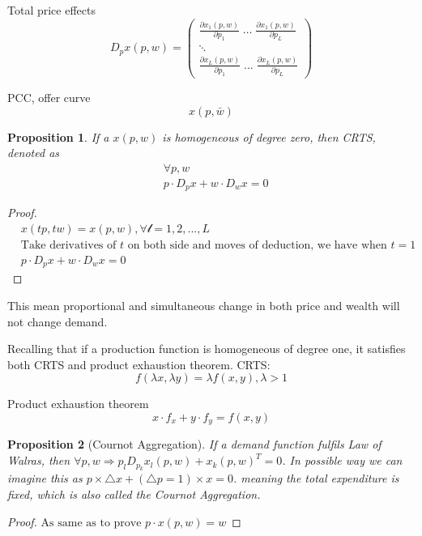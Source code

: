 \documentclass{article}
\newtheorem{proposition}{Proposition}
\begin{document}
Total price effects
$$D_{p}x(p,w)=\begin{pmatrix}\frac{\partial x_{1}(p,w)}{\partial p_{1}}\; \dots\;\frac{\partial x_{1}(p,w)}{\partial p_{L}} \\  \ddots \\ \frac{\partial x_{L}(p,w)}{\partial p_{1}}\;\dots\;\frac{\partial x_{L}(p,w)}{\partial p_{L}}\end{pmatrix}$$

PCC, offer curve
$$x(p,\bar{w})$$


\begin{proposition}
If a $x(p,w)$ is homogeneous of degree zero, then CRTS, denoted as
\begin{align}
&\forall p,w
\\&p\cdot D_{p}x+w\cdot D_{w}x=0
\end{align}
\end{proposition}

\begin{proof}
\begin{align}
& x(tp,tw)=x(p,w),\forall \mathscr{l}=1,2,...,L
\\&\text{Take derivatives of }t \text{ on both side and moves of deduction, we have when } t=1
\\& p\cdot D_{p}x+w\cdot D_{w}x=0
\end{align}
\end{proof}

This mean proportional and simultaneous change in both price and wealth will not change demand.




Recalling that if a production function is homogeneous of degree one, it satisfies both CRTS and product exhaustion theorem.
CRTS:
$$f(\lambda x, \lambda y)=\lambda f(x,y),\lambda>1$$

Product exhaustion theorem
$$x\cdot f_{x}+y\cdot f_{y}=f(x,y)$$


\begin{proposition}[Cournot Aggregation]
If a demand function fulfils Law of Walras, then $\forall p,w \Rightarrow p_{l} D_{p_{k}}x_{l}(p,w)+x_{k}(p,w)^{T}=0$. In possible way we can imagine this as $p \times \triangle x+(\triangle p=1)\times x=0$. meaning the total expenditure is fixed, which is also called the Cournot Aggregation.
\end{proposition}

\begin{proof}
$\text{As same as to prove } p\cdot x(p,w)=w$
\end{proof}
\end{document}
